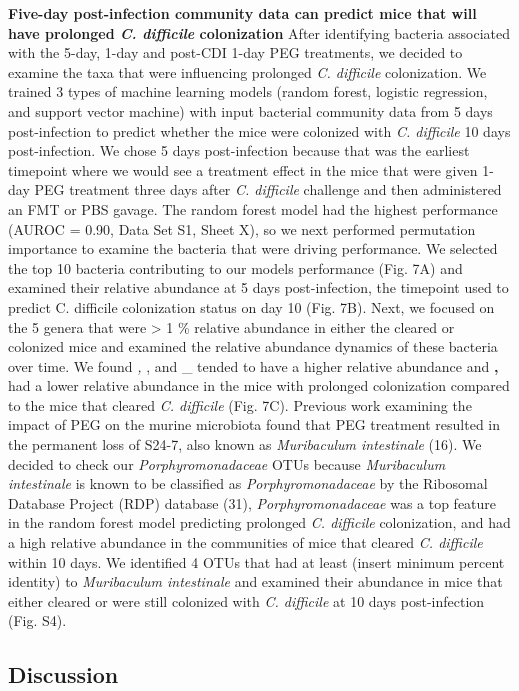 \documentclass[
  11pt,
]{article}
\begin{document}
\textbf{Five-day post-infection community data can predict mice that
will have prolonged \emph{C. difficile} colonization} After identifying
bacteria associated with the 5-day, 1-day and post-CDI 1-day PEG
treatments, we decided to examine the taxa that were influencing
prolonged \emph{C. difficile} colonization. We trained 3 types of
machine learning models (random forest, logistic regression, and support
vector machine) with input bacterial community data from 5 days
post-infection to predict whether the mice were colonized with \emph{C.
difficile} 10 days post-infection. We chose 5 days post-infection
because that was the earliest timepoint where we would see a treatment
effect in the mice that were given 1-day PEG treatment three days after
\emph{C. difficile} challenge and then administered an FMT or PBS
gavage. The random forest model had the highest performance (AUROC =
0.90, Data Set S1, Sheet X), so we next performed permutation importance
to examine the bacteria that were driving performance. We selected the
top 10 bacteria contributing to our models performance (Fig. 7A) and
examined their relative abundance at 5 days post-infection, the
timepoint used to predict C. difficile colonization status on day 10
(Fig. 7B). Next, we focused on the 5 genera that were \textgreater{} 1
\% relative abundance in either the cleared or colonized mice and
examined the relative abundance dynamics of these bacteria over time. We
found \emph{, }, and \_ tended to have a higher relative abundance and
\textbf{, } had a lower relative abundance in the mice with prolonged
colonization compared to the mice that cleared \emph{C. difficile} (Fig.
7C). Previous work examining the impact of PEG on the murine microbiota
found that PEG treatment resulted in the permanent loss of S24-7, also
known as \emph{Muribaculum intestinale} (16). We decided to check our
\emph{Porphyromonadaceae} OTUs because \emph{Muribaculum intestinale} is
known to be classified as \emph{Porphyromonadaceae} by the Ribosomal
Database Project (RDP) database (31), \emph{Porphyromonadaceae} was a
top feature in the random forest model predicting prolonged \emph{C.
difficile} colonization, and had a high relative abundance in the
communities of mice that cleared \emph{C. difficile} within 10 days. We
identified 4 OTUs that had at least (insert minimum percent identity) to
\emph{Muribaculum intestinale} and examined their abundance in mice that
either cleared or were still colonized with \emph{C. difficile} at 10
days post-infection (Fig. S4).

\hypertarget{discussion}{%
\subsection{Discussion}\label{discussion}}
\end{document}
